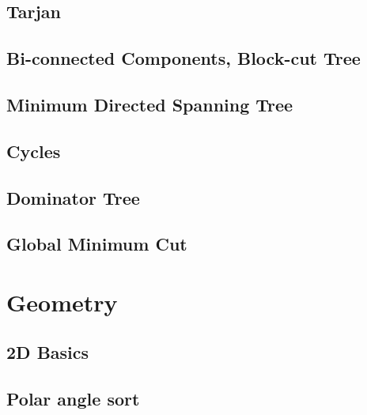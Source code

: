 \subsection{Tarjan}
\raggedbottom
\hrulefill
\subsection{Bi-connected Components, Block-cut Tree}
\raggedbottom
\hrulefill
\subsection{Minimum Directed Spanning Tree}
\raggedbottom
\hrulefill
\subsection{Cycles}
\raggedbottom
\hrulefill
\subsection{Dominator Tree}
\raggedbottom
\hrulefill
\subsection{Global Minimum Cut}
\raggedbottom
\hrulefill



\section{Geometry}
\subsection{2D Basics}
\raggedbottom
\hrulefill
\subsection{Polar angle sort}
\raggedbottom
\hrulefill
